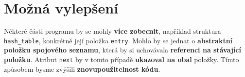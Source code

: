 \documentclass[12pt]{report}
\begin{document}
	\section{Možná vylepšení}
	Některé části programu by se mohly \textbf{více zobecnit}, například struktura \texttt{hash\_table}, konkrétně její položka \texttt{entry}. Mohlo by se jednat o \textbf{abstraktní položku spojového seznamu}, která by si uchovávala \textbf{referenci na stávající položku}. Atribut \texttt{next} by v tomto případě \textbf{ukazoval na obal} položky. Tímto způsobem bysme zvýšili \textbf{znovupoužitelnost kódu}.
\end{document}
